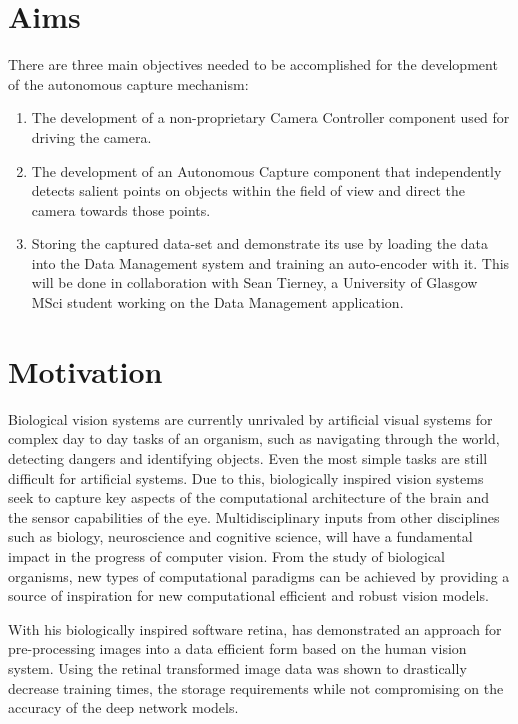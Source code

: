 \documentclass{l4proj}
\begin{document}
 
 \section{Aims}
 
 There are three main objectives needed to be accomplished for the development of the autonomous capture mechanism:
 
\vspace{0.2cm}  
\begin{enumerate}
    \item The development of a non-proprietary Camera Controller component used for driving the camera.
    \item The development of an Autonomous Capture component that independently detects salient points on objects within the field of view and direct the camera towards those points.  
    \item Storing the captured data-set and demonstrate its use by loading the data into the Data Management system and training an auto-encoder with it. This will be done in collaboration with Sean Tierney, a University of Glasgow MSci student working on the Data Management application. 
    
    
\end{enumerate}


\section{Motivation}
 


 Biological vision systems are currently unrivaled by artificial visual systems for complex day to day tasks of an organism, such as navigating through the world, detecting dangers and identifying objects. Even the most simple tasks are still difficult for artificial systems. Due to this, biologically inspired vision systems seek to capture key aspects of the computational architecture of the brain and the sensor capabilities of the eye. Multidisciplinary inputs from other disciplines such as biology, neuroscience and cognitive science, will have a fundamental impact in the progress of computer vision. From the study of biological organisms, new types of computational paradigms can be achieved by providing a source of inspiration for new computational efficient and robust vision models.
 
 With his biologically inspired software retina, \citet{Ozimek} has demonstrated an approach for pre-processing images into a data efficient form based on the human vision system. Using the retinal transformed image data was shown to drastically decrease training times, the storage requirements while not compromising on the accuracy of the deep network models. 
 
\end{document}
